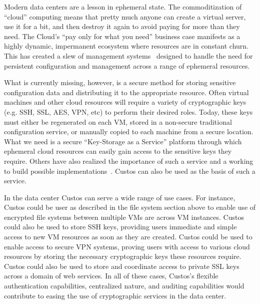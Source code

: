 Modern data centers are a lesson in ephemeral state. The
commoditization of ``cloud'' computing means that pretty much anyone
can create a virtual server, use it for a bit, and then destroy it
again to avoid paying for more than they need. The Cloud's ``pay only
for what you need'' business case manifests as a highly dynamic,
impermanent ecosystem where resources are in constant churn. This has
created a slew of management systems~\cite{chef, salt, puppet}
designed to handle the need for persistent configuration and
management across a range of ephemeral resources.

What is currently missing, however, is a secure method for storing
sensitive configuration data and distributing it to the appropriate
resource. Often virtual machines and other cloud resources will
require a variety of cryptographic keys (e.g. SSH, SSL, AES, VPN, etc)
to perform their desired roles. Today, these keys must either be
regenerated on each VM, stored in a non-secure traditional
configuration service, or manually copied to each machine from a
secure location. What we need is a secure ``Key-Storage as a Service''
platform through which ephemeral cloud resources can easily gain
access to the sensitive keys they require. Others have also realized
the importance of such a service and a working to build possible
implementations~\cite{cloudkeep-presentation, cloudkeep,
  gazzang}. Custos can also be used as the basis of such a service.

In the data center Custos can serve a wide range of use cases. For
instance, Custos could be user as described in the file system section
above to enable use of encrypted file systems between multiple VMs are
across VM instances. Custos could also be used to store SSH keys,
providing users immediate and simple access to new VM resources as
soon as they are created. Custos could be used to enable access to
secure VPN systems, proving users with access to various cloud
resources by storing the necessary cryptographic keys these resources
require. Custos could also be used to store and coordinate access to
private SSL keys across a domain of web services. In all of these
cases, Custos's flexible authentication capabilities, centralized
nature, and auditing capabilities would contribute to easing the use
of cryptographic services in the data center.

